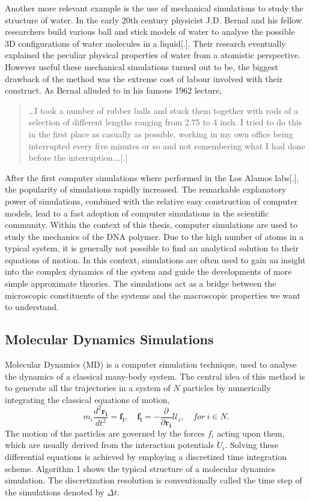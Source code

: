 Another more relevant example is the use of mechanical simulations to study the
structure of water.  In the early 20th century physicist J.D. Bernal and his fellow
researchers build various ball and stick models of water to analyse the possible 3D
configurations of water molecules in a liquid[.]. Their research eventually explained the
peculiar physical properties of water from a atomistic perspective. However useful these
mechanical simulations turned out to be, the biggest drawback of the method was the
extreme cost of labour involved with their construct. As Bernal alluded to in his
famous 1962 lecture,

\begin{quote}
\dots I took a number of rubber balls and stuck them together with rods of a
selection of different lengths ranging from 2.75 to 4 inch. I tried to do this in the
first place as casually as possible, working in my own office being interrupted every
five minutes or so and not remembering what I had done before the interruption.\dots[.]
\end{quote}

After the first computer simulations where performed in the Los Alamos labs[.], the
popularity of simulations rapidly increased. The remarkable explanatory power of
simulations, combined with the relative easy construction of computer models, lead to a
fast adoption of computer simulations in the scientific community. Within the context of
this thesis, computer simulations are used to study the mechanics of
the DNA polymer. Due to the high number of atoms in a typical system, it is generally
not possible to find an analytical solution to their equations of motion. In this
context, simulations are often used to gain an insight into the complex dynamics of the
system and guide the developments of more simple approximate theories. The simulations
act as a bridge between the microscopic constituents of the systems and the macroscopic
properties we want to understand.


\subsection{Molecular Dynamics Simulations}
Molecular Dynamics (MD) is a computer simulation technique, used to analyse
the dynamics of a classical many-body system. The central idea of this method is to
generate all the trajectories in a system of $N$ particles by numerically
integrating the classical equations of motion,
\[
m_i \frac{d^2 \boldsymbol{r_i}}{dt^2} = \boldsymbol{f_i}, \quad \boldsymbol{f_i} = -
    \frac{\partial}{\partial \boldsymbol{r_i}} \mathcal{U}_i, \quad for\ i \in N.
\]
The motion of the particles are governed by the forces $f_i$ acting upon them, which are
usually derived from the interaction potentials $U_i$.
Solving these differential equations is achieved by employing a discretized time
integration scheme.  Algorithm 1 shows the typical structure of a molecular dynamics
simulation. The discretization resolution is conventionally called the time step of the
simulations denoted by $\Delta t$.\\

